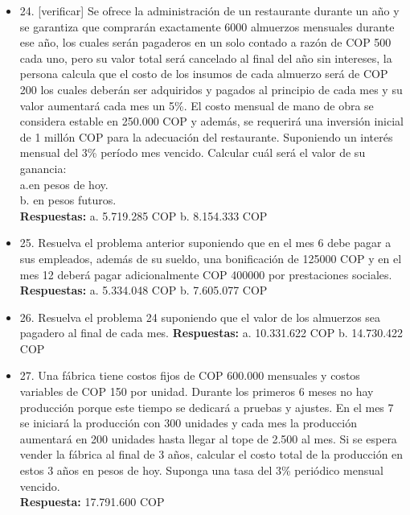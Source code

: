 \begin{itemize}
 \item 24. [verificar] Se ofrece la administración de un restaurante durante un año y se garantiza que comprarán exactamente 6000 almuerzos mensuales durante ese año, los cuales serán pagaderos en un solo contado a razón de COP 500 cada uno, pero su valor total será cancelado al final del año sin intereses, la persona calcula que el costo de los insumos de cada almuerzo será de COP 200 los cuales deberán ser adquiridos y pagados al principio de cada mes y su valor aumentará cada mes un 5\%. El costo mensual de mano de obra se considera estable en  250.000 COP y además, se requerirá una inversión inicial de  1 millón COP para la adecuación del restaurante. Suponiendo un interés mensual del 3\% período mes vencido. Calcular cuál será el valor de su ganancia:\\
       a.en pesos de hoy.\\
       b. en pesos futuros.\\
       \textbf{Respuestas:} a.  5.719.285 COP \hspace{1cm}  	b. 8.154.333 COP\\
       \medskip

 \item 25. Resuelva el problema anterior suponiendo que en el mes 6 debe pagar a sus empleados, además de su sueldo, una bonificación de 125000 COP y en el mes 12 deberá pagar adicionalmente COP 400000 por prestaciones sociales.\\
       \textbf{Respuestas:}  a. 5.334.048 COP \hspace{1cm}  	b. 7.605.077 COP\\
       \medskip

 \item 26. Resuelva el problema 24 suponiendo que el valor de los almuerzos sea pagadero al final de cada mes.
       \textbf{Respuestas:} a. 10.331.622 COP \hspace{1cm}  	b. 14.730.422 COP\\
       \medskip

 \item 27. Una fábrica tiene costos fijos de COP 600.000 mensuales y costos variables de COP 150 por unidad. Durante los primeros 6 meses no hay producción porque este tiempo se dedicará a pruebas y ajustes. En el mes 7 se iniciará la producción con 300 unidades y cada mes la producción aumentará en 200 unidades hasta llegar al tope de 2.500 al mes. Si se espera vender la fábrica al final de 3 años, calcular el costo total de la producción en estos 3 años en pesos de hoy. Suponga una tasa del 3\% periódico  mensual vencido.\\
       \textbf{Respuesta:}  17.791.600 COP\\
       \medskip


\end{itemize}
